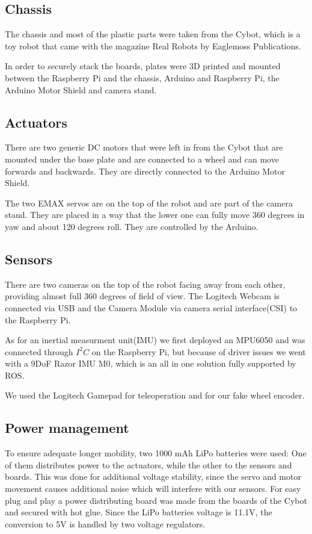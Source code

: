 \documentclass[class=article, crop=false]{standalone}
\begin{document}
\subsection{Chassis}\label{subsec:chassis}
The chassis and most of the plastic parts were taken from the Cybot, which is a toy robot that came with the magazine Real Robots by Eaglemoss Publications\footnotemark.


In order to securely stack the boards, plates were 3D printed and mounted between the Raspberry Pi and the chassis, Arduino and Raspberry Pi, the Arduino Motor Shield and camera stand.

\subsection{Actuators}\label{subsec:actuators}
There are two generic DC motors that were left in from the Cybot that are mounted under the base plate and are connected to a wheel and can move forwards and backwards. They are directly connected to the Arduino Motor Shield.

The two EMAX servos are on the top of the robot and are part of the camera stand. They are placed in a way that the lower one can fully move 360 degrees in yaw and about 120 degrees roll. They are controlled by the Arduino.

\subsection{Sensors}\label{subsec:sensors}
There are two cameras on the top of the robot facing away from each other, providing almost full 360 degrees of field of view. The Logitech Webcam is connected via USB and the Camera Module via camera serial interface(CSI) to the Raspberry Pi.

As for an inertial measurment unit(IMU) we first deployed an MPU6050 and was connected through $ I^2C $ on the Raspberry Pi, but because of driver issues we went with a 9DoF Razor IMU M0, which is an all in one solution fully supported by ROS.

We used the Logitech Gamepad for teleoperation and for our fake wheel encoder.

\subsection{Power management}\label{subsec:power}
To ensure adequate longer mobility, two 1000 mAh LiPo batteries were used: One of them distributes power to the actuators, while the other to the sensors and boards. This was done for additional voltage stability, since the servo and motor movement causes additional noise which will interfere with our sensors. For easy plug and play a power distributing board was made from the boards of the Cybot and secured with hot glue. Since the LiPo batteries voltage is 11.1V, the conversion to 5V is handled by two voltage regulators.
\end{document}
